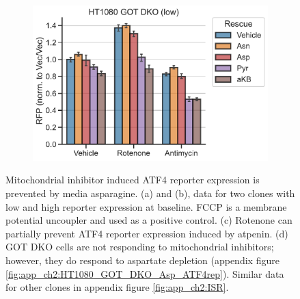\begin{figure}
\begin{subfigure}[b]{0.4\textwidth}
         \caption{}
         \label{fig:ch2:143B_Atp_ATF4rep}
     \end{subfigure}
     \hspace{0.06\textwidth}
     \begin{subfigure}[b]{0.4\textwidth}
         \includegraphics[width=\textwidth]{figures/chap2/HT1080_GOT_DKO_ETCinhib_ATF4rep.pdf}
         \caption{}
         \label{fig:ch2:HT1080_GOT_DKO_ETCinhib_ATF4rep}
     \end{subfigure}
        \caption[Mitochondrial inhibitor induced ATF4 is rescued by Asn]{
        Mitochondrial inhibitor induced ATF4 reporter expression is prevented by media asparagine.
        (a) and (b), data for two clones with low and high reporter expression at baseline.
        FCCP is a membrane potential uncoupler and used as a positive control.
        (c) Rotenone can partially prevent ATF4 reporter expression induced by atpenin.
        (d) GOT DKO cells are not responding to mitochondrial inhibitors; however, they do respond to aspartate depletion (appendix figure \ref{fig:app_ch2:HT1080_GOT_DKO_Asp_ATF4rep}).
        Similar data for other clones in appendix figure \ref{fig:app_ch2:ISR}.
        }
        \label{fig:ch2:ISR}
\end{figure}

